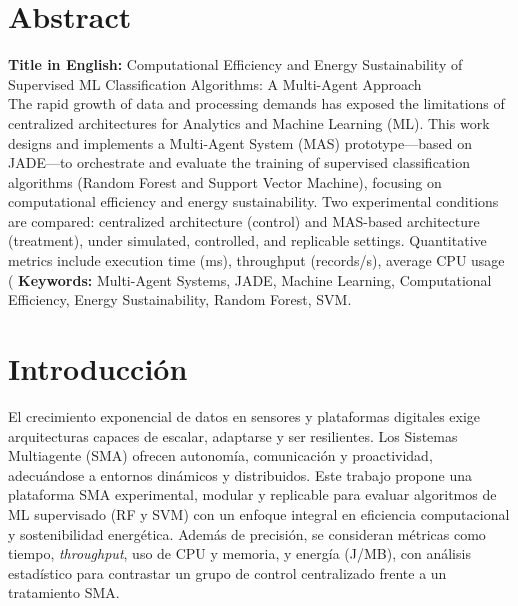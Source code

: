 \documentclass[12pt,oneside]{report}
\begin{document}
\chapter*{Abstract}
\textbf{Title in English:} Computational Efficiency and Energy Sustainability of Supervised ML Classification Algorithms: A Multi-Agent Approach\\[0.2cm]
The rapid growth of data and processing demands has exposed the limitations of centralized architectures for Analytics and Machine Learning (ML). This work designs and implements a Multi-Agent System (MAS) prototype—based on JADE—to orchestrate and evaluate the training of supervised classification algorithms (Random Forest and Support Vector Machine), focusing on computational efficiency and energy sustainability. Two experimental conditions are compared: centralized architecture (control) and MAS-based architecture (treatment), under simulated, controlled, and replicable settings. Quantitative metrics include execution time (ms), throughput (records/s), average CPU usage (%
\textbf{Keywords:} Multi-Agent Systems, JADE, Machine Learning, Computational Efficiency, Energy Sustainability, Random Forest, SVM.

\tableofcontents
\listoffigures
\listoftables
\clearpage

\setcounter{page}{1}

\chapter{Introducción}
El crecimiento exponencial de datos en sensores y plataformas digitales exige arquitecturas capaces de escalar, adaptarse y ser resilientes. Los Sistemas Multiagente (SMA) ofrecen autonomía, comunicación y proactividad, adecuándose a entornos dinámicos y distribuidos. Este trabajo propone una plataforma SMA experimental, modular y replicable para evaluar algoritmos de ML supervisado (RF y SVM) con un enfoque integral en eficiencia computacional y sostenibilidad energética. Además de precisión, se consideran métricas como tiempo, \textit{throughput}, uso de CPU y memoria, y energía (J/MB), con análisis estadístico para contrastar un grupo de control centralizado frente a un tratamiento SMA.
\end{document}
